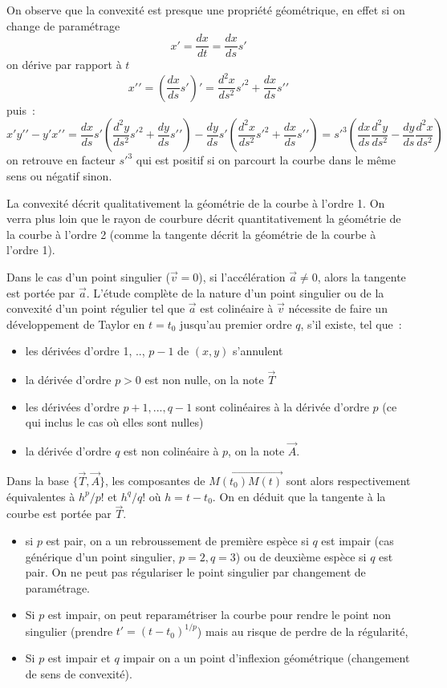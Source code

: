 \documentclass[a4paper,11pt]{article}
\begin{document}
\begin{giacjshere}
On observe que la convexit\'e est presque une propri\'et\'e g\'eom\'etrique,
en effet si on change de param\'etrage
$$ x'=\frac{dx}{dt} =\frac{dx}{ds} s' $$
on d\'erive par rapport \`a $t$
$$ x'{'} = (\frac{dx}{ds} s')'=\frac{d^2x}{ds^2} s'^2 + \frac{dx}{ds}
s'{'} $$
puis~:
$$ x'y'{'}- y' x'{'} = 
\frac{dx}{ds} s' (\frac{d^2y}{ds^2} s'^2 +\frac{dy}{ds} s'{'} ) - 
\frac{dy}{ds} s' (\frac{d^2x}{ds^2} s'^2 +\frac{dx}{ds} s'{'} ) 
= s'^3 (\frac{dx}{ds} \frac{d^2y}{ds^2} - 
\frac{dy}{ds} \frac{d^2x}{ds^2} )
 $$
on retrouve en facteur $s'^3$ qui est positif si on parcourt la courbe
dans le m\^eme sens ou n\'egatif sinon.

La convexit\'e d\'ecrit qualitativement la g\'eom\'etrie
de la courbe \`a l'ordre 1. On verra plus loin que le rayon de courbure d\'ecrit
quantitativement la g\'eom\'etrie de la courbe \`a l'ordre
2 (comme la tangente d\'ecrit la g\'eom\'etrie de la courbe
\`a l'ordre 1).

Dans le cas d'un point singulier ($\overrightarrow{v}=0$), si 
l'acc\'el\'eration $\overrightarrow{a}\neq 0$, alors la
tangente est port\'ee par $\overrightarrow{a}$. L'\'etude compl\`ete
de la nature
d'un point singulier ou de la convexit\'e d'un point r\'egulier
tel que $\overrightarrow{a}$ est colin\'eaire \`a $\overrightarrow{v}$ 
n\'ecessite de faire un
d\'eveloppement de Taylor en $t=t_0$
jusqu'au premier ordre $q$, s'il existe, tel que~: 
\begin{itemize}
\item les d\'eriv\'ees d'ordre 1, .., $p-1$ de $(x,y)$ s'annulent
\item la d\'eriv\'ee d'ordre $p>0$ est non nulle, on la note $\overrightarrow{T}$
\item les d\'eriv\'ees d'ordre $p+1,...,q-1$ sont colin\'eaires
\`a la d\'eriv\'ee d'ordre $p$ (ce qui inclus le cas o\`u elles
sont nulles)
\item la d\'eriv\'ee d'ordre $q$ est non colin\'eaire \`a $p$,
on la note $\overrightarrow{A}$.
\end{itemize}
Dans la base $\{ \overrightarrow{T},\overrightarrow{A}\}$, les
composantes de $\overrightarrow{M(t_0)M(t)}$
sont alors respectivement \'equivalentes \`a $h^p/p!$ et $h^q/q!$
o\`u $h=t-t_0$.
On en d\'eduit que la tangente \`a la courbe est port\'ee par
$\overrightarrow{T}$.
\begin{itemize}
\item si $p$ est pair, on a un rebroussement 
de premi\`ere esp\`ece 
si $q$ est impair (cas g\'en\'erique d'un point singulier, $p=2, q=3$)
ou de deuxi\`eme esp\`ece si $q$ est pair. On ne peut pas
r\'egulariser le point singulier par changement de param\'etrage.
\item Si $p$ est impair, on peut reparam\'etriser la courbe
pour rendre le point non singulier (prendre $t'=(t-t_0)^{1/p}$)
mais au risque de perdre de la r\'egularit\'e,
\item Si $p$ est impair et $q$ impair on a un point d'inflexion 
g\'eom\'etrique (changement de sens de convexit\'e).
\end{itemize}


\end{giacjshere}
\end{document}
